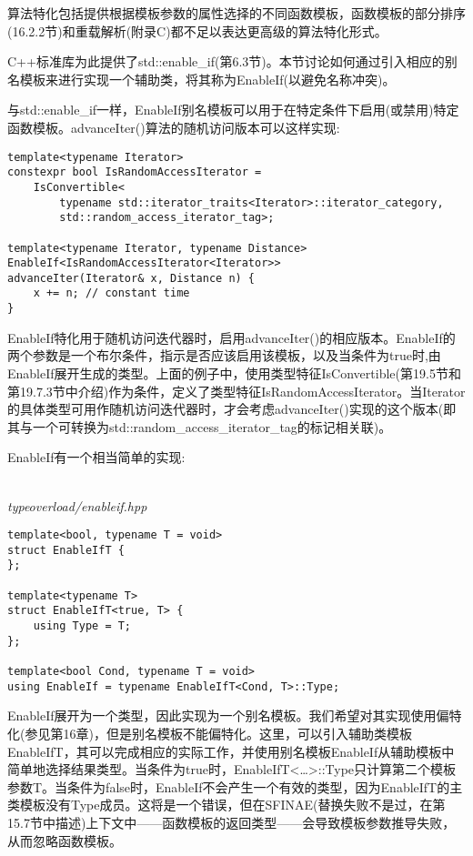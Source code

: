 
算法特化包括提供根据模板参数的属性选择的不同函数模板，函数模板的部分排序(16.2.2节)和重载解析(附录C)都不足以表达更高级的算法特化形式。

C++标准库为此提供了std::enable\_if(第6.3节)。本节讨论如何通过引入相应的别名模板来进行实现一个辅助类，将其称为EnableIf(以避免名称冲突)。

与std::enable\_if一样，EnableIf别名模板可以用于在特定条件下启用(或禁用)特定函数模板。advanceIter()算法的随机访问版本可以这样实现:

\begin{lstlisting}[style=styleCXX]
template<typename Iterator>
constexpr bool IsRandomAccessIterator =
	IsConvertible<
		typename std::iterator_traits<Iterator>::iterator_category,
		std::random_access_iterator_tag>;
		
template<typename Iterator, typename Distance>
EnableIf<IsRandomAccessIterator<Iterator>>
advanceIter(Iterator& x, Distance n) {
	x += n; // constant time
}
\end{lstlisting}

EnableIf特化用于随机访问迭代器时，启用advanceIter()的相应版本。EnableIf的两个参数是一个布尔条件，指示是否应该启用该模板，以及当条件为true时,由EnableIf展开生成的类型。上面的例子中，使用类型特征IsConvertible(第19.5节和第19.7.3节中介绍)作为条件，定义了类型特征IsRandomAccessIterator。当Iterator的具体类型可用作随机访问迭代器时，才会考虑advanceIter()实现的这个版本(即其与一个可转换为std::random\_access\_iterator\_tag的标记相关联)。

EnableIf有一个相当简单的实现:

\hspace*{\fill} \\ %
\noindent
\textit{typeoverload/enableif.hpp}
\begin{lstlisting}[style=styleCXX]
template<bool, typename T = void>
struct EnableIfT {
};

template<typename T>
struct EnableIfT<true, T> {
	using Type = T;
};

template<bool Cond, typename T = void>
using EnableIf = typename EnableIfT<Cond, T>::Type;
\end{lstlisting}

EnableIf展开为一个类型，因此实现为一个别名模板。我们希望对其实现使用偏特化(参见第16章)，但是别名模板不能偏特化。这里，可以引入辅助类模板EnableIfT，其可以完成相应的实际工作，并使用别名模板EnableIf从辅助模板中简单地选择结果类型。当条件为true时，EnableIfT<…>::Type只计算第二个模板参数T。当条件为false时，EnableIf不会产生一个有效的类型，因为EnableIfT的主类模板没有Type成员。这将是一个错误，但在SFINAE(替换失败不是过，在第15.7节中描述)上下文中——函数模板的返回类型——会导致模板参数推导失败，从而忽略函数模板。

